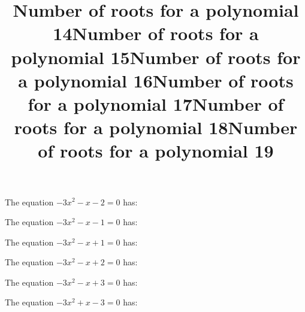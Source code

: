 \documentclass{article}
\begin{document}
\begin{category}
\begin{question}[multichoice]

\end{question}
\begin{question}[multichoice]
\title{Number of roots for a polynomial 14}
The equation $- 3 x^{2} - x - 2=0$ has:


\end{question}
\begin{question}[multichoice]
\title{Number of roots for a polynomial 15}
The equation $- 3 x^{2} - x - 1=0$ has:


\end{question}
\begin{question}[multichoice]
\title{Number of roots for a polynomial 16}
The equation $- 3 x^{2} - x + 1=0$ has:


\end{question}
\begin{question}[multichoice]
\title{Number of roots for a polynomial 17}
The equation $- 3 x^{2} - x + 2=0$ has:


\end{question}
\begin{question}[multichoice]
\title{Number of roots for a polynomial 18}
The equation $- 3 x^{2} - x + 3=0$ has:


\end{question}
\begin{question}[multichoice]
\title{Number of roots for a polynomial 19}
The equation $- 3 x^{2} + x - 3=0$ has:



\end{question}
\end{category}
\end{document}
